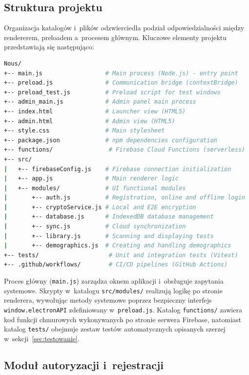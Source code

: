 \documentclass[12pt, a4paper, oneside]{report}
\begin{document}
\subsection{Struktura projektu}
\label{subsec:struktura}

Organizacja katalogów i~plików odzwierciedla podział odpowiedzialności między rendererem, preloadem a~procesem głównym. Kluczowe elementy projektu przedstawiają się następująco:
\begin{lstlisting}[language=bash]
Nous/
+-- main.js                  # Main process (Node.js) - entry point
+-- preload.js               # Communication bridge (contextBridge)
+-- preload_test.js          # Preload script for test windows
+-- admin_main.js            # Admin panel main process
+-- index.html               # Launcher view (HTML5)
+-- admin.html               # Admin view (HTML5)
+-- style.css                # Main stylesheet
+-- package.json             # npm dependencies configuration
+-- functions/                # Firebase Cloud Functions (serverless)
+-- src/
|   +-- firebaseConfig.js    # Firebase connection initialization
|   +-- app.js               # Main renderer logic
|   +-- modules/             # UI functional modules
|       +-- auth.js          # Registration, online and offline login
|       +-- cryptoService.js # Local and E2E encryption
|       +-- database.js      # IndexedDB database management
|       +-- sync.js          # Cloud synchronization
|       +-- library.js       # Scanning and displaying tests
|       +-- demographics.js  # Creating and handling demographics
+-- tests/                    # Unit and integration tests (Vitest)
+-- .github/workflows/        # CI/CD pipelines (GitHub Actions)
\end{lstlisting}

Proces główny (\texttt{main.js}) zarządza oknem aplikacji i~obsługuje zapytania systemowe. Skrypty w~katalogu \texttt{src/modules/} realizują logikę po stronie renderera, wywołując metody systemowe poprzez bezpieczny interfejs \texttt{window.electronAPI} zdefiniowany w~\texttt{preload.js}. Katalog \texttt{functions/} zawiera kod funkcji chmurowych wykonywanych po stronie serwera Firebase, natomiast katalog \texttt{tests/} obejmuje zestaw testów automatycznych opisanych szerzej w~sekcji~\ref{sec:testowanie}.

\subsection{Moduł autoryzacji i~rejestracji}
\label{subsec:impl-auth}
\end{document}
